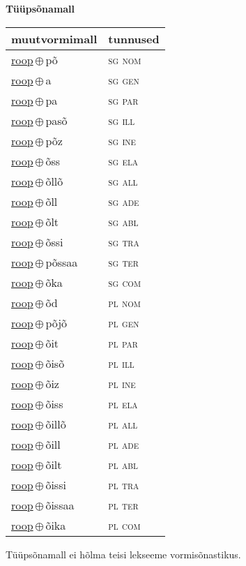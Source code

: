 

\vspace{3.5em}
\noindent \begin{minipage}{\textwidth}
\noindent \textbf{Tüüpsõnamall \,}\\

\begin{sideways}
\begin{tabular}{l l}
muutvormimall & tunnused \\
\hline
\underline{roop}\,$\oplus$\,põ & \textsc{ sg nom } \\
\underline{roop}\,$\oplus$\,a & \textsc{ sg gen } \\
\underline{roop}\,$\oplus$\,pa & \textsc{ sg par } \\
\underline{roop}\,$\oplus$\,pasõ & \textsc{ sg ill } \\
\underline{roop}\,$\oplus$\,põz & \textsc{ sg ine } \\
\underline{roop}\,$\oplus$\,õss & \textsc{ sg ela } \\
\underline{roop}\,$\oplus$\,õllõ & \textsc{ sg all } \\
\underline{roop}\,$\oplus$\,õll & \textsc{ sg ade } \\
\underline{roop}\,$\oplus$\,õlt & \textsc{ sg abl } \\
\underline{roop}\,$\oplus$\,õssi & \textsc{ sg tra } \\
\underline{roop}\,$\oplus$\,põssaa & \textsc{ sg ter } \\
\underline{roop}\,$\oplus$\,õka & \textsc{ sg com } \\
\underline{roop}\,$\oplus$\,õd & \textsc{ pl nom } \\
\underline{roop}\,$\oplus$\,põjõ & \textsc{ pl gen } \\
\underline{roop}\,$\oplus$\,õit & \textsc{ pl par } \\
\underline{roop}\,$\oplus$\,õisõ & \textsc{ pl ill } \\
\underline{roop}\,$\oplus$\,õiz & \textsc{ pl ine } \\
\underline{roop}\,$\oplus$\,õiss & \textsc{ pl ela } \\
\underline{roop}\,$\oplus$\,õillõ & \textsc{ pl all } \\
\underline{roop}\,$\oplus$\,õill & \textsc{ pl ade } \\
\underline{roop}\,$\oplus$\,õilt & \textsc{ pl abl } \\
\underline{roop}\,$\oplus$\,õissi & \textsc{ pl tra } \\
\underline{roop}\,$\oplus$\,õissaa & \textsc{ pl ter } \\
\underline{roop}\,$\oplus$\,õika & \textsc{ pl com } \\
\end{tabular}
\end{sideways}
\label{tab:tüüpsõnamall-rooppõ}

\end{minipage}

 
\vspace{1em}
\noindent Tüüpsõnamall  ei hõlma teisi lekseeme vormi\-sõnastikus.
